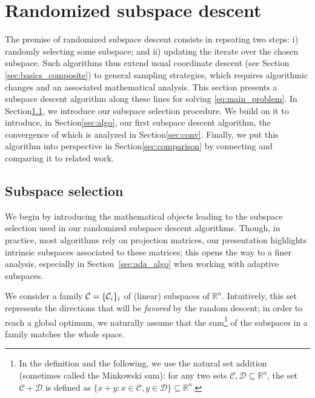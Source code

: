 \section{Randomized subspace descent}
\label{sec:mor-randomized-subspace}


The premise of randomized subspace descent consists in repeating two steps: i) randomly selecting some subspace; and ii) updating the iterate over the chosen subspace. {Such algorithms thus extend usual coordinate descent (see Section \ref{sec:basics_composite}) to general sampling strategies, which requires algorithmic changes and an associated mathematical analysis. }
This section presents a subspace descent algorithm along these lines for solving \eqref{eq:main_problem}. In Section\;\ref{sec:sub}, we introduce our subspace selection procedure. We build on it to introduce, in Section\;\ref{sec:algo}, our first subspace descent algorithm, the convergence of which is analyzed in Section\;\ref{sec:conv}. Finally, we put this algorithm into perspective in Section\;\ref{sec:comparison} by connecting and comparing it to related work.

\subsection{Subspace selection}\label{sec:sub}

We begin by introducing the mathematical objects leading to the subspace selection used in our randomized subspace descent algorithms. Though, in practice, most algorithms rely on projection matrices, our presentation highlights intrinsic subspaces associated to these matrices; this opens the way to a finer analysis, especially in Section~\ref{sec:ada_algo} when working with adaptive subspaces. 

We consider a family $\mathcal{C} = \{ \mathcal{C}_i \}_i$ of {(linear)} subspaces of $\mathbb{R}^n$. Intuitively, this set represents the directions that will be \emph{favored} by the random descent; in order to reach a global optimum, we naturally assume that the sum\footnote{In the definition and the following, we use the natural set addition (sometimes called the Minkowski sum): for any two sets $\mathcal{C},\mathcal{D}\subseteq\mathbb{R}^n$, the set  $\mathcal{C} + \mathcal{D}$ is defined as $\{x+y : x\in\mathcal{C},y\in\mathcal{D}\}\subseteq\mathbb{R}^n$.} of the subspaces in a family matches the whole space.%

